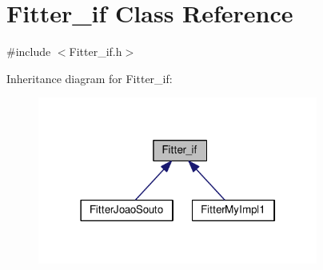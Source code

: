 \hypertarget{class_fitter__if}{\section{Fitter\-\_\-if Class Reference}
\label{class_fitter__if}
}


{\ttfamily \#include $<$Fitter\-\_\-if.\-h$>$}



Inheritance diagram for Fitter\-\_\-if\-:
\nopagebreak
\begin{figure}[H]
\begin{center}
\leavevmode
\includegraphics[width=261pt]{class_fitter__if__inherit__graph}
\end{center}
\end{figure}

